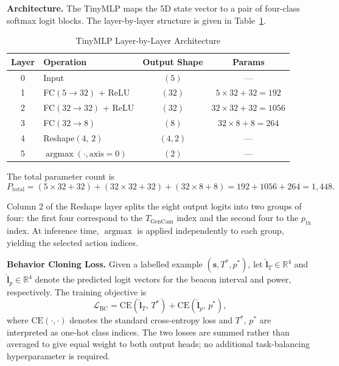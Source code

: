 \documentclass[journal]{IEEEtran}
\begin{document}
\textbf{Architecture.}
The TinyMLP maps the 5D state vector to a pair of four-class softmax
logit blocks.  The layer-by-layer structure is given in
Table~\ref{tab:arch}.

\begin{table}[!t]
  \centering
  \caption{TinyMLP Layer-by-Layer Architecture}
  \label{tab:arch}
  \renewcommand{\arraystretch}{1.2}
  \begin{tabular}{clcc}
    \toprule
    \textbf{Layer} & \textbf{Operation} & \textbf{Output Shape} & \textbf{Params} \\
    \midrule
    0 & Input              & $(5)$    & ---   \\
    1 & FC$(5 \to 32)$ + ReLU  & $(32)$   & $5{\times}32 + 32 = 192$   \\
    2 & FC$(32 \to 32)$ + ReLU & $(32)$   & $32{\times}32 + 32 = 1056$ \\
    3 & FC$(32 \to 8)$         & $(8)$    & $32{\times}8 + 8 = 264$    \\
    4 & Reshape$(4,\,2)$       & $(4, 2)$ & ---   \\
    5 & $\operatorname{argmax}(\cdot, \text{axis}=0)$ & $(2)$ & --- \\
    \bottomrule
  \end{tabular}
\end{table}

\noindent
The total parameter count is
\begin{equation}
  P_{\text{total}}
  = (5 \times 32 + 32)
  + (32 \times 32 + 32)
  + (32 \times 8 + 8)
  = 192 + 1056 + 264
  = 1{,}448.
  \label{eq:param_count}
\end{equation}

Column 2 of the Reshape layer splits the eight output logits into two
groups of four: the first four correspond to the $T_{\text{GenCam}}$
index and the second four to the $p_{\text{tx}}$ index.
At inference time, $\operatorname{argmax}$ is applied independently
to each group, yielding the selected action indices.

\textbf{Behavior Cloning Loss.}
Given a labelled example $(\mathbf{s}, T^{*}, p^{*})$, let
$\hat{\mathbf{l}}_{T} \in \mathbb{R}^4$ and
$\hat{\mathbf{l}}_{p} \in \mathbb{R}^4$ denote the predicted logit
vectors for the beacon interval and power, respectively.  The
training objective is
\begin{equation}
  \mathcal{L}_{\text{BC}} =
  \mathrm{CE}\!\left(\hat{\mathbf{l}}_{T},\, T^{*}\right)
  +
  \mathrm{CE}\!\left(\hat{\mathbf{l}}_{p},\, p^{*}\right),
  \label{eq:bc_loss}
\end{equation}
where $\mathrm{CE}(\cdot, \cdot)$ denotes the standard
cross-entropy loss and $T^{*}$, $p^{*}$ are interpreted as
one-hot class indices.  The two losses are summed rather than
averaged to give equal weight to both output heads; no additional
task-balancing hyperparameter is required.
\end{document}
